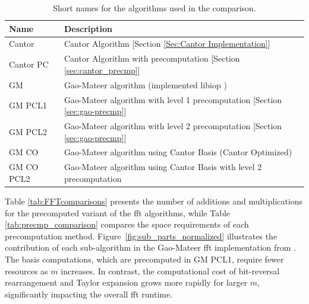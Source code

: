 \begin{table}[h]
	\centering
	\caption{Short names for the algorithms used in the comparison.}
	\setlength{\tabcolsep}{8pt} %
		\begin{tabular}{ll}
			\toprule
			\textbf{Name} & \textbf{Description} \\
			\midrule
			Cantor & Cantor Algorithm  [Section \ref{Sec:Cantor Implementation}]\\
			Cantor PC & Cantor Algorithm with precomputation [Section \ref{sec:cantor_precmp}] \\
			GM & Gao-Mateer algorithm (implemented  libiop \cite{libiop}) \\
			GM PCL1 & Gao-Mateer algorithm with level 1 precomputation [Section \ref{sec:gao-precmp}] \\
			GM PCL2& Gao-Mateer algorithm with level 2 precomputation [Section \ref{sec:gao-precmp}] \\
			GM CO & Gao-Mateer algorithm using Cantor Basis (Cantor Optimized) \\
			GM CO PCL2& Gao-Mateer algorithm using Cantor Basis with level 2 precomputation \\
			\bottomrule
		\end{tabular}
	\label{tab:alg_shortnames}
\end{table}

Table \ref{tab:FFTcomparisons} presents the number of additions and multiplications for the precomputed variant of the \gls{fft} algorithms, while Table \ref{tab:precmp_comparison} compares the space requirements of each precomputation method. Figure~\ref{fig:sub_parts_normalized} illustrates the contribution of each sub-algorithm in the Gao-Mateer \gls{fft} implementation from \cite{libiop}. The basis computations, which are precomputed in GM PCL1, require fewer resources as \( m \) increases. In contrast, the computational cost of bit-reversal rearrangement and Taylor expansion grows more rapidly for larger \( m \), significantly impacting the overall \gls{fft} runtime.


